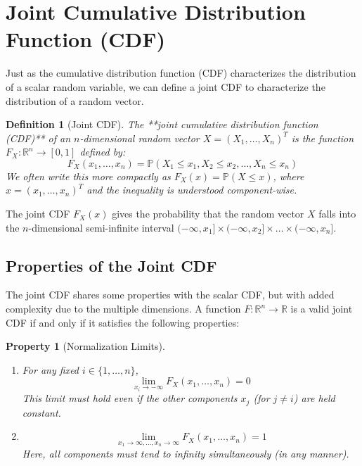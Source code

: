 \documentclass[11pt]{article}
\newtheorem{definition}[theorem]{Definition}
\newtheorem{property}[theorem]{Property}
\theoremstyle{definition} %
\newcommand{\R}{\mathbb{R}} %
\renewcommand{\P}{\mathbb{P}} %
\begin{document}
\section{Joint Cumulative Distribution Function (CDF)}

Just as the cumulative distribution function (CDF) characterizes the distribution of a scalar random variable, we can define a joint CDF to characterize the distribution of a random vector.

\begin{definition}[Joint CDF]
The **joint cumulative distribution function (CDF)** of an $n$-dimensional random vector $X = (X_1, \dots, X_n)^T$ is the function $F_X: \R^n \to [0, 1]$ defined by:
\[ F_X(x_1, \dots, x_n) = \P(X_1 \le x_1, X_2 \le x_2, \dots, X_n \le x_n) \]
We often write this more compactly as $F_X(x) = \P(X \le x)$, where $x = (x_1, \dots, x_n)^T$ and the inequality is understood component-wise.
\end{definition}

The joint CDF $F_X(x)$ gives the probability that the random vector $X$ falls into the $n$-dimensional semi-infinite interval $(-\infty, x_1] \times (-\infty, x_2] \times \dots \times (-\infty, x_n]$.

\subsection{Properties of the Joint CDF}

The joint CDF shares some properties with the scalar CDF, but with added complexity due to the multiple dimensions. A function $F: \R^n \to \R$ is a valid joint CDF if and only if it satisfies the following properties:

\begin{property}[Normalization Limits] \label{prop:cdf_limits} ~
    \begin{enumerate}
        \item[(a)] For any fixed $i \in \{1, \dots, n\}$,
        \[ \lim_{x_i \to -\infty} F_X(x_1, \dots, x_n) = 0 \]
        This limit must hold even if the other components $x_j$ (for $j \neq i$) are held constant.
        \item[(b)]
        \[ \lim_{x_1 \to \infty, \dots, x_n \to \infty} F_X(x_1, \dots, x_n) = 1 \]
        Here, all components must tend to infinity simultaneously (in any manner).
    \end{enumerate}
\end{property}
\end{document}
